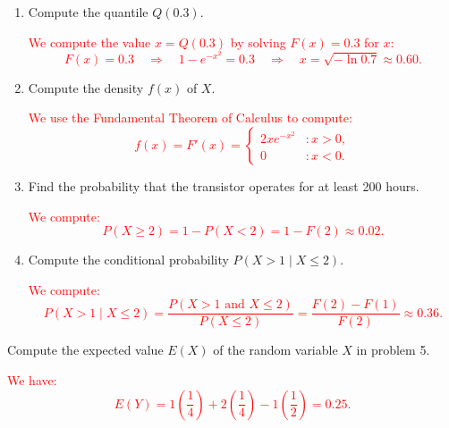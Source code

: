 \documentclass[12pt,reqno]{amsart}
\begin{document}
\medskip
\begin{enumerate}
\item Compute the quantile $Q(0.3)$.
    
\bigskip
\textcolor{red}{We compute the value $x = Q(0.3)$ by solving $F(x) = 0.3$ for $x$:
    	\[
	F(x) = 0.3 \quad \Rightarrow \quad 1 - e^{-x^2} = 0.3 \quad \Rightarrow \quad x = \sqrt{-\ln{0.7}} \approx 0.60.
	\]}
\bigskip

\item Compute the density $f(x)$ of $X$.
    
\bigskip
\textcolor{red}{We use the Fundamental Theorem of Calculus to compute:
    	\[
	f(x) = F'(x) = \begin{cases}
	2xe^{-x^2} & : x>0, \\
	0 & : x<0.
	\end{cases}
	\]}
\bigskip

\item Find the probability that the transistor operates for at least 200 hours.
    
\bigskip
\textcolor{red}{We compute:
    	\[
	P(X\geq 2) = 1 - P(X<2) = 1- F(2) \approx 0.02.
	\]}
\bigskip

\item Compute the conditional probability $P(X>1 \mid X\leq 2)$.
    
\bigskip
\textcolor{red}{We compute:
    	\[
	P(X>1 \mid X\leq 2) = \frac{P(X>1 \text{ and } X\leq 2)}{P(X\leq 2)} = \frac{F(2)-F(1)}{F(2)} \approx 0.36.
	\]}
\bigskip
\end{enumerate}



















\bigskip
\prob Compute the expected value $E(X)$ of the random variable $X$ in problem 5.

\bigskip
\textcolor{red}{We have:
	\[
	E(Y) = 1\left( \frac{1}{4} \right) + 2\left( \frac{1}{4} \right) - 1 \left( \frac{1}{2} \right) = 0.25.
	\]}
\end{document}
